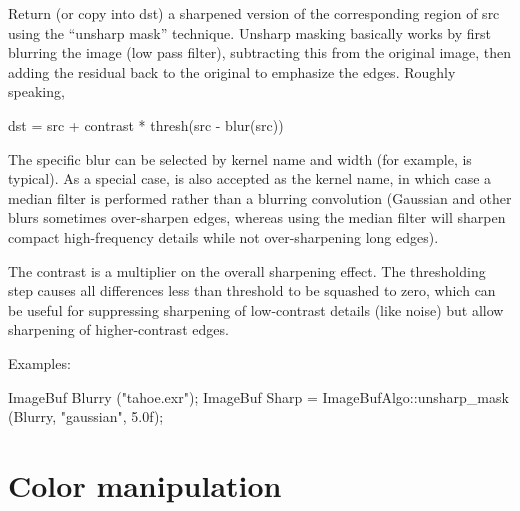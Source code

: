 Return (or copy into {\cf dst}) a sharpened version of the
corresponding region of {\cf src} using the ``unsharp mask'' technique.
Unsharp masking basically works by first blurring the image (low
pass filter), subtracting this from the original image, then
adding the residual back to the original to emphasize the edges.
Roughly speaking,

\begin{code}
     dst = src + contrast * thresh(src - blur(src))
\end{code}

The specific blur can be selected by kernel name and width (for example,
 is typical). As a special case,  is also accepted
as the kernel name, in which case a median filter is performed rather than
a blurring convolution (Gaussian and other blurs sometimes over-sharpen edges,
whereas using the median filter will sharpen compact high-frequency details
while not over-sharpening long edges).

The {\cf contrast} is a multiplier on the overall sharpening effect.  The
thresholding step causes all differences less than {\cf threshold} to be
squashed to zero, which can be useful for suppressing sharpening of
low-contrast details (like noise) but allow sharpening of
higher-contrast edges.

\smallskip
\noindent Examples:
\begin{code}
    ImageBuf Blurry ("tahoe.exr");
    ImageBuf Sharp = ImageBufAlgo::unsharp_mask (Blurry, "gaussian", 5.0f);
\end{code}
\apiend


\section{Color manipulation}
\label{sec:iba:color}

